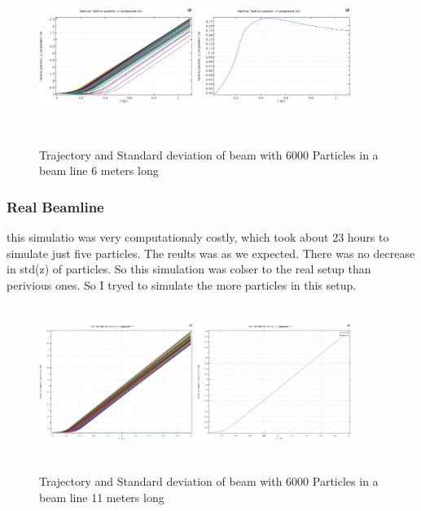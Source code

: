 \documentclass[12pt,a4paper]{article}
\begin{document}
\begin{figure}[h]
\centering
\includegraphics[width=50mm, height=50mm]{sim-in-100-long}
\includegraphics[width=50mm, height=50mm]{sim-std-100-long}
\caption{Trajectory and Standard deviation of beam with 6000 Particles in a beam line 6 meters long }
\end{figure}

\newpage
 
\subsubsection{Real Beamline}
this simulatio was very computationaly costly, which took about 23 hours to simulate just five particles. The reults was as we expected. There was no decrease in std(z) of particles. So this simulation was colser to the real setup than perivious ones. So I tryed to simulate the more particles in this setup.

\begin{figure}[h]
\centering
\includegraphics[width=50mm, height=50mm]{sim-in-100-11met}
\includegraphics[width=50mm, height=50mm]{sim-std-100-11met}
\caption{Trajectory and Standard deviation of beam with 6000 Particles in a beam line 11 meters long }
\end{figure}
\end{document}
